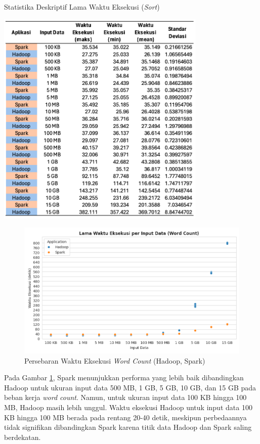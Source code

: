 \begin{table}[h]
  \centering
  \caption{Statistika Deskriptif Lama Waktu Eksekusi (\textit{Sort})}
  \includegraphics[width=0.75\textwidth]{figures/ch04/4-sort-dur-table}
  \label{table:4-sort-dur-table}
\end{table}

\begin{figure}[h]
    \centering
    \includegraphics[width=1\textwidth]{figures/ch04/1-lama-waktu-eksekusi-wordcount.png}
    \caption{Persebaran Waktu Eksekusi \textit{Word Count} (Hadoop, Spark)}
    \label{fig:lama-waktu-eksekusi-wordcount}
\end{figure}

\newpage
Pada Gambar \ref{fig:lama-waktu-eksekusi-wordcount}, Spark menunjukkan performa yang lebih baik dibandingkan Hadoop untuk ukuran input data 500 MB, 1 GB, 5 GB, 10 GB, dan 15 GB pada beban kerja \textit{word count}. Namun, untuk ukuran input data 100 KB hingga 100 MB, Hadoop masih lebih unggul. Waktu eksekusi Hadoop untuk input data 100 KB hingga 100 MB berada pada rentang 20-40 detik, meskipun perbedaannya tidak signifikan dibandingkan Spark karena titik data Hadoop dan Spark saling berdekatan.

